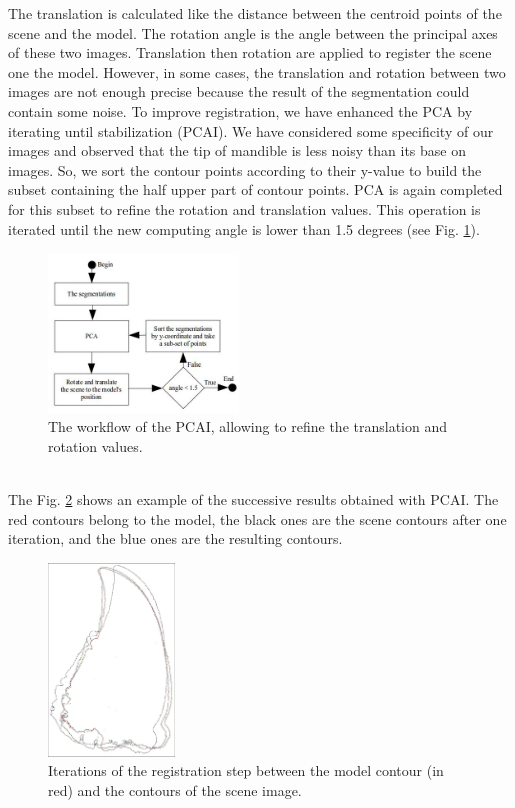 \documentclass[twoside,twocolumn,10pt]{article}
\begin{document}
The translation is calculated like the distance between the centroid points of the scene and the model.
The rotation angle is the angle between the principal axes of these two images. Translation then rotation are applied to register the scene one the model. However, in some cases, the translation and rotation between two images are
not enough precise because the result of the segmentation could contain some noise.
To improve registration, we have enhanced the PCA by iterating until stabilization (PCAI).
We have considered some specificity of our images and observed that the tip of mandible is less noisy than its base on images.
So, we sort the contour points according to their y-value to build the subset containing the half upper part of contour points.
PCA is again completed for this subset to refine the rotation and translation values. This operation is iterated until the new computing angle is lower than 1.5 degrees (see Fig. \ref{fig:pcai}).
\begin{figure}[htb]
    \centering
    \includegraphics[width=0.45\textwidth]{./images/pcadiagram}
    \caption{The workflow of the PCAI, allowing to refine the translation and rotation values.}
    \label{fig:pcai}
\end{figure}~\\
The Fig. \ref{fig:box} shows an example of the successive results obtained with PCAI. The red contours belong to the model, the black ones are the scene contours after one iteration, and the blue ones are the resulting contours.\\

\begin{figure}[htb]
    \centering
    \includegraphics[width=0.3\textwidth]{./images/imreg}
    \caption{Iterations of the registration step between the model contour (in red) and the contours of the scene image.}
    \label{fig:box}
\end{figure}
\end{document}
